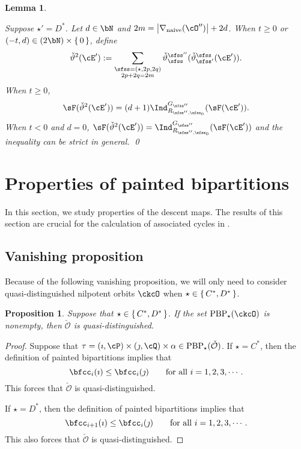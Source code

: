 \documentclass[12pt,a4paper]{amsart}
\def\abs#1{\left|{#1}\right|}
\newcommand{\CO}{{\mathcal {O}}}
\def\DD{\nabla}
\numberwithin{equation}{section}
\newtheorem{lem}[thm]{Lemma}
\newtheorem{prop}[thm]{Proposition}
\theoremstyle{remark}
\def\DDn{\DD_{\mathrm{naive}}}
\def\cOpp{\cO^{\prime\prime}}
\def\PBP{\mathrm{PBP}}
\begin{document}
{\begin{lem}
\begin{enuma}
 \item Suppose $\star' = D^*$.
    Let $d\in \bN$ and $2m = \abs{\DDn(\cOpp)}+2d$.
    When $t\geq 0$ or $(-t,d) \in (2\bN)\times \set{0}$, define
 \[
   \dblift(\cE') :=
   \sum_{\substack{\sfss = (\star,2p,2q)\\ 2p+2q=2m}}
   \dlift_{\sfss}^{\sfss''}(\dlift_{\sfss'}^{\sfss}(\cE')).
   \]
  When $t\geq 0$,
  \[
    \sF(\dblift(\cE')) = (d+1) \indsss(\sF(\cE')).
  \]
  When $t< 0$ and $d=0$,  $\sF(\dblift(\cE')) = \indsss(\sF(\cE'))$
  and the inequality can be strict in general. \qed
  \end{enuma}
\end{lem}
}



\section{Properties of painted bipartitions}\label{sec:ppb}
\def\ckfgg{{\check \fgg}}
\def\pcT{\cT^+}
\def\ncT{\cT^-}

In this section, we study properties of the descent maps. The results of this section are
crucial for the calculation of associated cycles in .


\subsection{Vanishing proposition}

Because of the following vanishing proposition, we will only need to consider
quasi-distinguished nilpotent orbits $\ckcO$ when $\star\in \set{C^*, D^*}$.

\begin{prop}\label{prop:CD*}
  Suppose that $\star\in \set{C^*, D^*}$. If the set $\PBP_\star(\ckcO)$ is nonempty, then $\check \CO$ is quasi-distinguished.
\end{prop}
\begin{proof}
  Suppose that $\tau=(\imath,\cP)\times(\jmath,\cQ)\times \alpha \in  \mathrm{PBP}_\star(\check \CO)$. If  $\star=C^*$, then  the definition of painted bipartitions implies that
 \[
 \bfcc_i(\imath)\leq \bfcc_i(\jmath) \qquad \textrm{for all } i=1,2,3, \cdots.
 \]
This forces that $\check \CO$ is quasi-distinguished.

 If  $\star=D^*$, then  the definition of painted bipartitions implies that
 \[
 \bfcc_{i+1}(\imath)\leq \bfcc_i(\jmath) \qquad \textrm{for all } i=1,2,3, \cdots.
 \]
This  also forces that   $\check \CO$ is quasi-distinguished.
 \end{proof}
\end{document}
